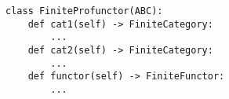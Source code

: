 \par\begin{minipage}{60ex}
\begin{verbatim}
class FiniteProfunctor(ABC):
    def cat1(self) -> FiniteCategory:
        ...
    def cat2(self) -> FiniteCategory:
        ...
    def functor(self) -> FiniteFunctor:
        ...
\end{verbatim}
\end{minipage}\par